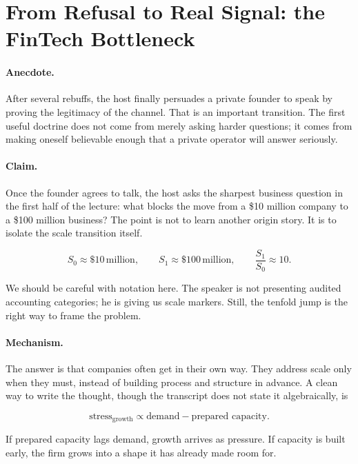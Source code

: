 \section{From Refusal to Real Signal: the FinTech Bottleneck}

\paragraph{Anecdote.} After several rebuffs, the host finally persuades a private founder to speak by proving the legitimacy of the channel. That is an important transition. The first useful doctrine does not come from merely asking harder questions; it comes from making oneself believable enough that a private operator will answer seriously.

\paragraph{Claim.} Once the founder agrees to talk, the host asks the sharpest business question in the first half of the lecture: what blocks the move from a \$10 million company to a \$100 million business? The point is not to learn another origin story. It is to isolate the scale transition itself.

\begin{equation}
S_0 \approx \$10\,\text{million},\qquad S_1 \approx \$100\,\text{million},\qquad \frac{S_1}{S_0} \approx 10.
\end{equation}

We should be careful with notation here. The speaker is not presenting audited accounting categories; he is giving us scale markers. Still, the tenfold jump is the right way to frame the problem.

\paragraph{Mechanism.} The answer is that companies often get in their own way. They address scale only when they must, instead of building process and structure in advance. A clean way to write the thought, though the transcript does not state it algebraically, is

\begin{equation}
\text{stress}_{\text{growth}} \propto \text{demand} - \text{prepared capacity}.
\end{equation}

If prepared capacity lags demand, growth arrives as pressure. If capacity is built early, the firm grows into a shape it has already made room for.

